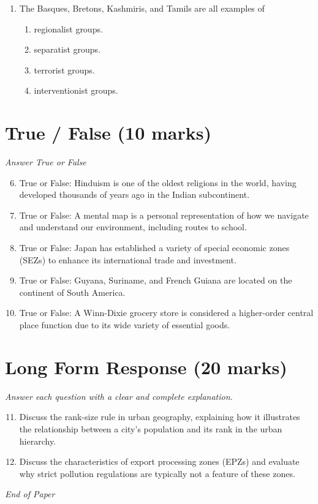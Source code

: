 \documentclass[12pt]{article}
\begin{document}
\begin{enumerate}[label=\arabic*.]
\begin{enumerate}[label=(\alph*)]
    \item new residents live peacefully with old residents.
    \item new residents assimilate with old residents completely.
    \item new residents move into areas occupied by older resident groups.
\end{enumerate}
\item The Basques, Bretons, Kashmiris, and Tamils are all examples of
\begin{enumerate}[label=(\alph*)]
    \item regionalist groups.
    \item separatist groups.
    \item terrorist groups.
    \item interventionist groups.
\end{enumerate}
\end{enumerate}

\section*{True / False (10 marks)}
\textit{Answer True or False}
\begin{enumerate}[label=\arabic*.]
\setcounter{enumi}{5}
\item True or False: Hinduism is one of the oldest religions in the world, having developed thousands of years ago in the Indian subcontinent.
\item True or False: A mental map is a personal representation of how we navigate and understand our environment, including routes to school.
\item True or False: Japan has established a variety of special economic zones (SEZs) to enhance its international trade and investment.
\item True or False: Guyana, Suriname, and French Guiana are located on the continent of South America.
\item True or False: A Winn-Dixie grocery store is considered a higher-order central place function due to its wide variety of essential goods.
\end{enumerate}

\section*{Long Form Response (20 marks)}
\textit{Answer each question with a clear and complete explanation.}
\begin{enumerate}[label=\arabic*.]
\setcounter{enumi}{10}
\item Discuss the rank-size rule in urban geography, explaining how it illustrates the relationship between a city's population and its rank in the urban hierarchy.
\item Discuss the characteristics of export processing zones (EPZs) and evaluate why strict pollution regulations are typically not a feature of these zones.
\end{enumerate}

\vfill
\noindent\textit{End of Paper}
\end{document}
